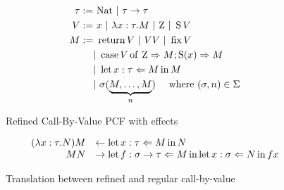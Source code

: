 \begin{figure}[h!]
    \begin{align*}
        \tau :=& ~\Nat ~|~ \tau \to \tau \\
        V :=& ~x ~|~ \lambda x:\tau. M ~|~ \Zero ~|~ \Succ V \\
        M :=& ~\Ret V ~|~ V V ~|~ \Fix V \\
                    &|~ \lcase{V}{M}{M} \\
                    &|~ \Bind{M}{x:\tau}{M} \\
                    &|~ \sigma(\underbrace{M, \dots, M}_n ) \quad \text{ where } (\sigma,n)  \in \Sigma
    \end{align*}
    \caption{Refined Call-By-Value PCF with effects}
    \label{fig:language}
\end{figure}

\begin{figure}[h!]
    \begin{equation*}
        \begin{array}{rl}
            (\lambda x:\tau. N)M &\leftarrow \Bind{M}{x:\tau}{N} \\
            M N &\rightarrow \Bind{M}{f:\sigma \to \tau}{\Bind{N}{x:\sigma}{ f x }} 
        \end{array}
    \end{equation*}
    \caption{Translation between refined and regular call-by-value}
    \label{fig:refinedNormal}
\end{figure}


